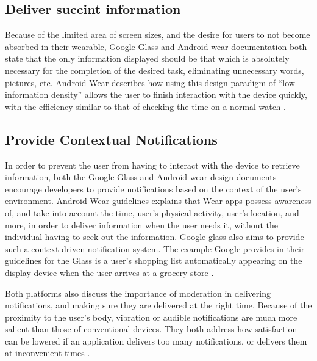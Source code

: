 \documentclass[12pt]{article}
\begin{document}
\subsection{Deliver succint information}
Because of the limited area of screen sizes, and the desire for users to not become absorbed in their wearable, Google Glass and Android wear documentation both state that the only information displayed should be that which is absolutely necessary for the completion of the desired task, eliminating unnecessary words, pictures, etc. Android Wear describes how using this design paradigm of ``low information density'' allows the user to finish interaction with the device quickly, with the efficiency similar to that of checking the time on a normal watch \cite{andr3}. 

\subsection{Provide Contextual Notifications}
In order to prevent the user from having to interact with the device to retrieve information, both the Google Glass and Android wear design documents encourage developers to provide notifications based on the context of the user's environment. Android Wear guidelines explains that Wear apps possess awareness of, and take into account the time, user's physical activity, user's location, and more, in order to deliver information when the user needs it, without the individual having to seek out the information\cite{andr2}. Google glass also aims to provide such a context-driven notification system. The example Google provides in their guidelines for the Glass is a user's shopping list automatically appearing on the display device when the user arrives at a grocery store \cite{goog}.

Both platforms also discuss the importance of moderation in delivering notifications, and making sure they are delivered at the right time. Because of the proximity to the user's body, vibration or audible notifications are much more salient than those of conventional devices. They both address how satisfaction can be lowered if an application delivers too many notifications, or delivers them at inconvenient times \cite{goog} \cite{andr}.
\end{document}
